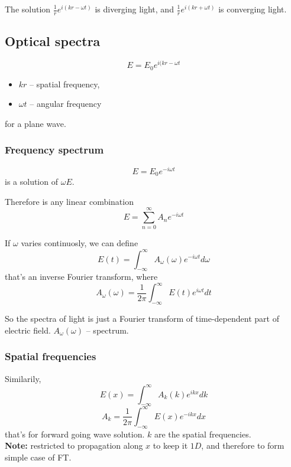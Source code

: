 \documentclass[10pt]{article}
\begin{document}
The solution $\frac{1}{r}e^{i(kr - \omega t)}$ is diverging light, and $\frac{1}{r}e^{i(kr + \omega t)}$ is converging light.

\subsection{Optical spectra}
\begin{equation*}
E = E_0 e^{i(kr - \omega t}
\end{equation*}
\begin{itemize}
\item $kr$ -- spatial frequency,
\item $\omega t$ -- angular frequency
\end{itemize}
for a plane wave.
\subsubsection{Frequency spectrum}
\begin{equation}\boxed{
E = E_0 e^{-i\omega t}
}\end{equation}
is a solution of $\omega E$.

Therefore is any linear combination
\begin{equation*}
E = \sum_{n=0} ^\infty A_n e^{-i\omega t}
\end{equation*}

If $\omega$ varies continuosly, we can define
\begin{equation}\boxed{
E(t) = \int_{-\infty} ^\infty A_\omega(\omega)e^{-i\omega t}d\omega
}\end{equation}
that's an inverse Fourier transform, where
\begin{equation}\boxed{
A_\omega(\omega) = \frac{1}{2\pi}\int_{-\infty} ^{\infty} E(t)e^{i\omega t}dt
}\end{equation}

So the spectra of light is just a Fourier transform of time-dependent part of electric field. $A_\omega(\omega)$ -- spectrum.

\subsubsection{Spatial frequencies}
Similarily,
\begin{equation}\boxed{
E(x)=\int_{-\infty} ^\infty A_k(k)e^{ikx}dk
}\end{equation}
\begin{equation}\boxed{
A_k = \frac{1}{2\pi}\int_{-\infty} ^\infty E(x) e^{-ikx}dx
}\end{equation}
that's for forward going wave solution. $k$ are the spatial frequencies.\\
\textbf{Note:} restricted to propagation along $x$ to keep it $1D$, and therefore to form simple case of FT.
\end{document}
